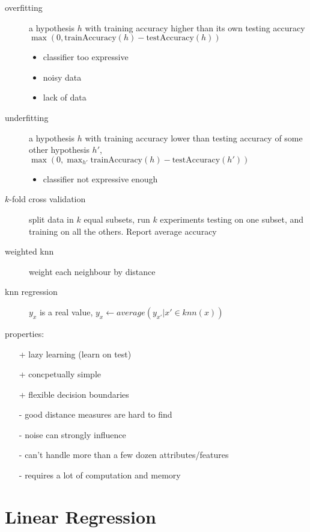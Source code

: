 \documentclass[]{article}
\theoremstyle{definition}
\begin{document}
	\begin{description}
		\item[overfitting] a hypothesis $h$ with training accuracy higher than its own testing accuracy $\max (0, \text{trainAccuracy}(h) - \text{testAccuracy}(h))$
			\begin{itemize}
				\item classifier too expressive
				\item noisy data
				\item lack of data
			\end{itemize}
		\item[underfitting] a hypothesis $h$ with training accuracy lower than testing accuracy of some other hypothesis $h'$, 
			$\max (0, \max_{h'} \text{trainAccuracy}(h) - \text{testAccuracy}(h'))$
            \begin{itemize}
                \item classifier not expressive enough
            \end{itemize}
        \item[$k$-fold cross validation] split data in $k$ equal subsets, run $k$ experiments testing on one subset, and training on all the others. Report average accuracy
	\end{description}

    \begin{description}
        \item[weighted knn] weight each neighbour by distance
        \item[knn regression] $y_x$ is a real value, $ y_x \leftarrow average({y_{x'}|x' \in knn(x)})$
    \end{description}

    properties:
    \begin{itemize}
        \item[+] lazy learning (learn on test)
        \item[+] concpetually simple
        \item[+] flexible decision boundaries
        \item[-] good distance measures are hard to find
        \item[-] noise can strongly influence
        \item[-] can't handle more than a few dozen attributes/features
        \item[-] requires a lot of computation and memory
    \end{itemize}

    \section{Linear Regression}
    \label{sec:linear_regression}
    
\end{document}
